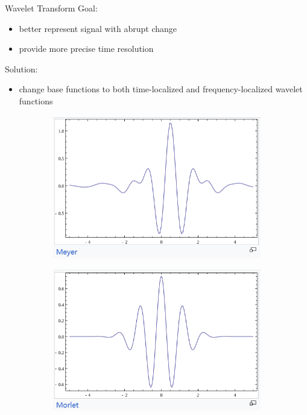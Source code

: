 \documentclass{beamer}
\begin{document}
\begin{frame}{Wavelet Transform}
	Goal:
	\begin{itemize}
		\item  better represent signal with abrupt change
			\item  provide more precise time resolution
	 \end{itemize}
	Solution:
	\begin{itemize}
		\item  change base functions to both time-localized and frequency-localized wavelet functions
	\end{itemize}
	
	\begin{figure}[h!]
		\centering
		\begin{subfigure}[b]{0.32\linewidth}
			\includegraphics[width=\linewidth]{Image/p3.png}
		\end{subfigure}
		\hfill
		\begin{subfigure}[b]{0.32\linewidth}
			\includegraphics[width=\linewidth]{Image/p4.png}

\end{subfigure}
\end{figure}
\end{frame}
\end{document}
